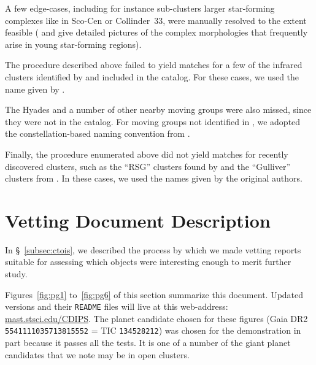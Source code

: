 \documentclass[12pt,twocolumn,tighten]{aastex62}
\begin{document}
A few edge-cases, including for instance sub-clusters  larger
star-forming complexes like in Sco-Cen or Collinder~33, were 
manually resolved to the extent feasible (\citealt{rizzuto_multidimensional_2011}
and \citealt{saurin_isolating_2015} give
detailed pictures of the complex morphologies that frequently arise in
young star-forming regions).

The procedure described above failed to yield matches for a few of the
infrared clusters identified by \citet{majaess_discovering_2013} and
included in the \citet{dias_proper_2014} catalog.
For these cases, we used the name given by \citet{dias_proper_2014}.

The Hyades and a number of other nearby moving groups were also
missed, since they were not in the \citet{Kharchenko_et_al_2013}
catalog.  For moving groups not identified in
\citet{Kharchenko_et_al_2013}, we adopted the constellation-based
naming convention from \citet{gagne_banyan_XI_2018}.  

Finally, the procedure enumerated above did not yield matches for
recently discovered clusters, such as the ``RSG'' clusters found by
\citet{roser_nine_RSG_2016} and the ``Gulliver'' clusters from
\citet{cantat-gaudin_gaia_2018}.  In these cases, we used the names
given by the original authors.

\section{Vetting Document Description}
\label{appendix:vetreport}

In \S~\ref{subsec:ctois}, we described the process by which we made 
vetting reports suitable for assessing which objects were interesting 
enough to merit further study.

Figures~\ref{fig:pg1} to~\ref{fig:pg6} of this
section summarize this document. Updated versions and their 
\texttt{README} files will live at this web-address: 
\url{mast.stsci.edu/CDIPS}.
The planet candidate chosen for these figures
(Gaia DR2 \texttt{5541111035713815552} = TIC \texttt{134528212}) was
chosen for the demonstration in part because it passes all
the tests.
It is one of a number of the giant planet candidates that we note may
be in open clusters.
\end{document}
